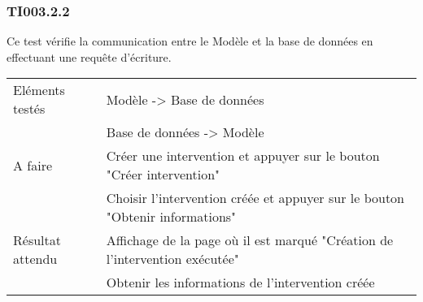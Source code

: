   		
  	\subsubsection{TI003.2.2}
  		Ce test vérifie la communication entre le Modèle et la base de données en effectuant une requête d'écriture.
  		\begin{center}
    	 		\begin{tabular}[h]{|p{}|p{}|}
			\hline
				Eléments testés & Modèle -> Base de données  \\
							    &  Base de données -> Modèle \\\hline
    				A faire & Créer une intervention et appuyer sur le bouton "Créer intervention" \\
    						& Choisir l'intervention créée et appuyer sur le bouton "Obtenir informations" \\\hline
    				Résultat attendu & Affichage de la page où il est marqué "Création de l'intervention exécutée" \\
    								 & Obtenir les informations de l'intervention créée \\\hline
     		\end{tabular}
  		\end{center}	
  		